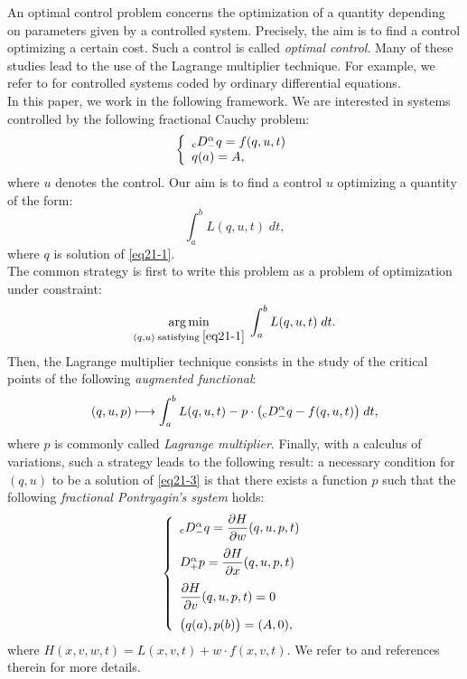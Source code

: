 \documentclass[english,11pt,reqno]{smfart}
\def\di{\displaystyle}
\newcommand{\cDM}{{}_{{\rm c}} D^\alpha_-}
\newcommand{\DP}{D^\alpha_+}
\DeclareMathOperator*{\argmin}{arg\,min}
\begin{document}
An optimal control problem concerns the optimization of a quantity depending on parameters given by a controlled system. Precisely, the aim is to find a control optimizing a certain cost. Such a control is called \textit{optimal control}. Many of these studies lead to the use of the Lagrange multiplier technique. For example, we refer to \cite{berg,favi,gunz2,gunz} for controlled systems coded by ordinary differential equations. \\

In this paper, we work in the following framework. We are interested in systems controlled by the following fractional Cauchy problem:
\begin{equation}\label{eq21-1}
\left\lbrace \begin{array}{l}
\cDM q = f (q,u,t) \\
q(a) = A,
\end{array} \right.
\end{equation}
where $u$ denotes the control. Our aim is to find a control $u$ optimizing a quantity of the form:
\begin{equation}\label{eq21-2}
\di \int_a^b L(q,u,t) \; dt ,
\end{equation}
where $q$ is solution of \eqref{eq21-1}. \\

The common strategy is first to write this problem as a problem of optimization under constraint: 
\begin{equation}\label{eq21-3}
\argmin\limits_{\substack{(q,u) \; \text{satisfying}\; \eqref{eq21-1}}} \; \di \int_a^b L(q,u,t) \; dt.
\end{equation}
Then, the Lagrange multiplier technique consists in the study of the critical points of the following \textit{augmented functional}:
\begin{equation}
(q,u,p) \longmapsto \di \int_a^b L(q,u,t)-p \cdot \big( \cDM q - f(q,u,t) \big) \; dt ,
\end{equation}
where $p$ is commonly called \textit{Lagrange multiplier}. Finally, with a calculus of variations, such a strategy leads to the following result: a necessary condition for $(q,u)$ to be a solution of \eqref{eq21-3} is that there exists a function $p$ such that the following \textit{fractional Pontryagin's system} holds:
\begin{equation}
 \left\lbrace \begin{array}{l}
 		\cDM q = \dfrac{\partial H}{\partial w} (q,u,p,t) \\[10pt]
 		\DP p = \dfrac{\partial H}{\partial x} (q,u,p,t) \\[10pt]
	    \dfrac{\partial H}{\partial v} (q,u,p,t) = 0 \\[10pt]
	    \big( q(a),p(b) \big) = ( A,0 ),
	    \end{array}
\right.
\end{equation}
where $ H(x,v,w,t) = L(x,v,t) + w  \cdot f(x,v,t) $. We refer to \cite{agra2,agra3,torr,torr2,jeli} and references therein for more details. \\
\end{document}
